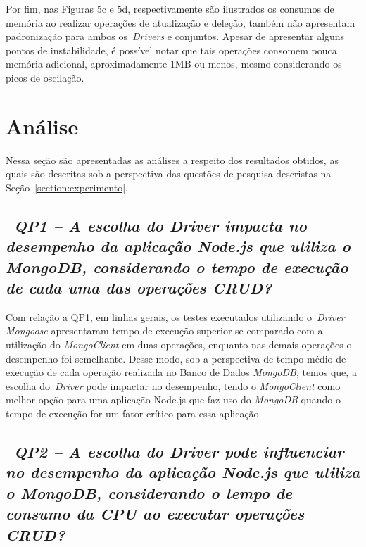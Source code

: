 \documentclass{svproc}
\begin{document}
Por fim, nas Figuras 5c e 5d, respectivamente são ilustrados os consumos de memória ao realizar operações de atualização e deleção, também não apresentam padronização para ambos os~\emph{Drivers} e conjuntos. 
Apesar de apresentar alguns pontos de instabilidade, é possível notar que tais operações consomem pouca memória adicional, aproximadamente 1MB ou menos, mesmo considerando os picos de oscilação.

\section{Análise}
\label{section:discussao}

Nessa seção são apresentadas as análises a respeito dos resultados obtidos, as quais são descritas sob a perspectiva das questões de pesquisa descristas na Seção~\ref{section:experimento}.

\subsection{~\emph{QP1 -- A escolha do Driver impacta no desempenho da aplicação Node.js que utiliza o MongoDB, considerando o tempo de execução de cada uma das operações CRUD?}}
\label{q1}

Com relação a QP1, em linhas gerais, os testes executados utilizando o~\emph{Driver} \emph{Mongoose} apresentaram tempo de execução superior se comparado com a utilização do \emph{MongoClient} em duas operações, enquanto nas demais operações o desempenho foi semelhante.
Desse modo, sob a perspectiva de tempo médio de execução de cada operação realizada no Banco de Dados \emph{MongoDB}, temos que, a escolha do~\emph{Driver} pode impactar no desempenho, tendo o \emph{MongoClient} como melhor opção para uma aplicação Node.js que faz uso do \emph{MongoDB} quando o tempo de execução for um fator crítico para essa aplicação.

\subsection{~\emph{QP2 -- A escolha do Driver pode influenciar no desempenho da aplicação Node.js que utiliza o MongoDB, considerando o tempo de consumo da CPU ao executar operações CRUD?}}
\label{q2}
\end{document}
